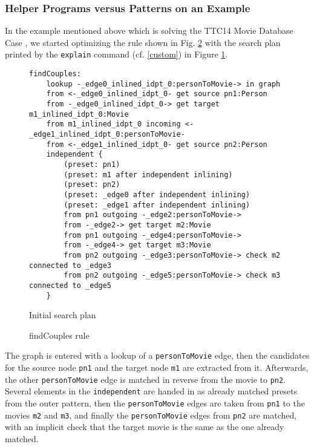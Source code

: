 \subsubsection*{Helper Programs versus Patterns on an Example}

In the example \cite{MovieDatabase} mentioned above which is solving the TTC14 Movie Database Case \cite{MovieDatabaseCase}, we started optimizing the rule shown in Fig. \ref{fig:findCouples.grg}
with the search plan printed by the \texttt{explain} command (cf. \ref{custom}) in Figure \ref{fig:InitialSP}.

\pagebreak

\begin{figure}[hp]
	\begin{verbatim}
findCouples:
    lookup -_edge0_inlined_idpt_0:personToMovie-> in graph
    from <-_edge0_inlined_idpt_0- get source pn1:Person
    from -_edge0_inlined_idpt_0-> get target m1_inlined_idpt_0:Movie
    from m1_inlined_idpt_0 incoming <-_edge1_inlined_idpt_0:personToMovie-
    from <-_edge1_inlined_idpt_0- get source pn2:Person
    independent {
        (preset: pn1)
        (preset: m1 after independent inlining)
        (preset: pn2)
        (preset: _edge0 after independent inlining)
        (preset: _edge1 after independent inlining)
        from pn1 outgoing -_edge2:personToMovie->
        from -_edge2-> get target m2:Movie
        from pn1 outgoing -_edge4:personToMovie->
        from -_edge4-> get target m3:Movie
        from pn2 outgoing -_edge3:personToMovie-> check m2 connected to _edge3
        from pn2 outgoing -_edge5:personToMovie-> check m3 connected to _edge5
    }
\end{verbatim}
	\caption{Initial search plan}
	\label{fig:InitialSP}
\end{figure}

\begin{figure}[h!p]
	
	\caption{findCouples rule}
	\label{fig:findCouples.grg}
\end{figure}

The graph is entered with a lookup of a \texttt{personToMovie} edge, then the candidates for the source node \texttt{pn1} and the target node \texttt{m1} are extracted from it.
Afterwards, the other \texttt{personToMovie} edge is matched in reverse from the movie to \texttt{pn2}.
Several elements in the \texttt{independent} are handed in as already matched presets from the outer pattern, 
then the \texttt{personToMovie} edges are taken from \texttt{pn1} to the movies \texttt{m2} and \texttt{m3}, 
and finally the \texttt{personToMovie} edges from \texttt{pn2} are matched, with an implicit check that the target movie is the same as the one already matched.


